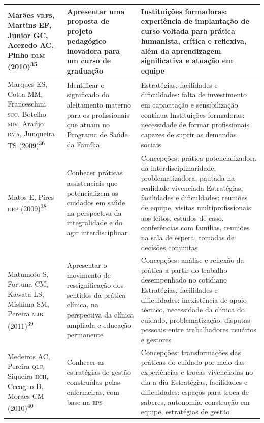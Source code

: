 \documentclass{article}
\begin{document}
\begin{table}
\begin{xtabular}{ l | l | l }
Marães \textsc{vrfs}, Martins EF, Junior GC, Acezedo AC, Pinho \textsc{dlm} (2010)\textsuperscript{35}

& Apresentar uma proposta de projeto pedagógico inovadora para um curso de
graduação
& Instituições formadoras: experiência de implantação de curso voltada para
prática humanista, crítica e reflexiva, além da aprendizagem significativa e
atuação em equipe
\\ \hline

Marques ES, Cotta MM, Franceschini \textsc{scc}, Botelho \textsc{miv}, Araújo \textsc{rma}, Junqueira TS
(2009)\textsuperscript{36}

& Identificar o significado do aleitamento materno para os profissionais que
atuam no Programa de Saúde da Família
& Estratégias, facilidades e dificuldades: falta de investimento em capacitação
e sensibilização contínua Instituições formadoras: necessidade de formar
profissionais capazes de suprir as demandas sociais
\\ \hline

Matos E, Pires \textsc{dep} (2009)\textsuperscript{38}

& Conhecer práticas assistenciais que potencializem os cuidados em saúde na
perspectiva da integralidade e do agir interdisciplinar
& Concepções: prática potencializadora da interdisciplinaridade,
problematizadora, pautada na realidade vivenciada Estratégias, facilidades e
dificuldades: reuniões de equipe, visitas multiprofissionais aos leitos, estudos
de caso, conferências com famílias, reuniões na sala de espera, tomadas de
decisões conjuntas
\\ \hline

Matumoto S, Fortuna CM, Kawata LS, Mishima SM, Pereira \textsc{mjb} (2011)\textsuperscript{39}

& Apresentar o movimento de ressignificação dos sentidos da prática clínica, na
perspectiva da clínica ampliada e educação permanente
& Concepções: análise e reflexão da prática a partir do trabalho desempenhado no
cotidiano Estratégias, facilidades e dificuldades: inexistência de apoio
técnico, necessidade da clínica do cuidado, problematização, disputas pessoais
entre trabalhadores usuários e gestores
\\ \hline

Medeiros AC, Pereira \textsc{qlc}, Siqueira \textsc{hch}, Cecagno D, Moraes CM (2010)\textsuperscript{40}

& Conhecer as estratégias de gestão construídas pelas enfermeiras, com base na
\textsc{eps}
& Concepções: transformações das práticas do cuidado por meio das experiências e
trocas vivenciadas no dia-a-dia Estratégias, facilidades e dificuldades: espaços
para troca de saberes, autonomia, construção em equipe, estratégias de gestão
\\ \hline


\end{xtabular}
\end{table}
\end{document}
